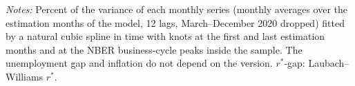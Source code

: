 \begin{table}[tp]\centering\scriptsize\setlength{\tabcolsep}{3pt}
\caption{Variance Fitted by a Spline Trend}\label{tab:slowshares}
\begin{flushleft}\footnotesize\textit{Notes:} Percent of the variance of each monthly series (monthly averages over the estimation months of the model, 12 lags, March--December 2020 dropped) fitted by a natural cubic spline in time with knots at the first and last estimation months and at the NBER business-cycle peaks inside the sample. The unemployment gap and inflation do not depend on the version. $r^*$-gap: Laubach--Williams $r^*$.\end{flushleft}
\end{table}
